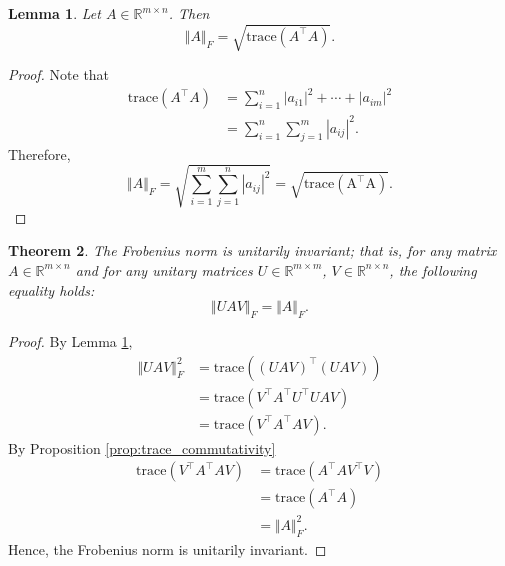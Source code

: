 \documentclass[12pt]{article}
\newtheorem{theorem}{Theorem}[subsection]
\newtheorem{lemma}[theorem]{Lemma}
\theoremstyle{definition}
\begin{document}
\begin{lemma} \label{lem:fro_norm_trace}
    Let $A\in\mathbb{R}^{m\times n}$. Then
    \[ \Vert A\Vert_F = \sqrt{\mathrm{trace}(A^\top A)}. \]
\end{lemma}

\begin{proof}
    Note that
    \[ 
    \begin{aligned}
        \mathrm{trace}(A^\top A)
        &= \sum_{i=1}^n |a_{i1}|^2 + \cdots + |a_{im}|^2 \\
        &= \sum_{i=1}^n \sum_{j=1}^m |a_{ij}|^2.
    \end{aligned}
    \]
    Therefore,
    \[ \Vert A\Vert_F 
    = \sqrt{\sum_{i=1}^m \sum_{j=1}^n |a_{ij}|^2} 
    = \sqrt{\mathrm{trace(A^\top A)}}. 
    \]
\end{proof}

\begin{theorem} \label{thm:frob_norm_unitarily_invariant}
    The Frobenius norm is unitarily invariant; that is, for any matrix $A\in\mathbb{R}^{m\times n}$ and for any unitary matrices $U\in\mathbb{R}^{m\times m}$, $V\in\mathbb{R}^{n\times n}$, the following equality holds:
    \[ \Vert UAV \Vert_F = \Vert A \Vert_F. \]
\end{theorem}
\begin{proof}
    By Lemma \ref{lem:fro_norm_trace},
    \begin{align*}
        \Vert UAV\Vert_F^2
        &= \mathrm{trace}((UAV)^\top(UAV)) \\
        &= \mathrm{trace}(V^\top A^\top U^\top UAV) \\
        &= \mathrm{trace}(V^\top A^\top AV).
    \end{align*}
    By Proposition \ref{prop:trace_commutativity}
    \begin{align*}
        \mathrm{trace}(V^\top A^\top AV)
        &= \mathrm{trace}(A^\top AV^\top V) \\
        &= \mathrm{trace}(A^\top A) \\
        &= \Vert A\Vert_F^2.
    \end{align*}
    Hence, the Frobenius norm is unitarily invariant.
\end{proof}
\end{document}
